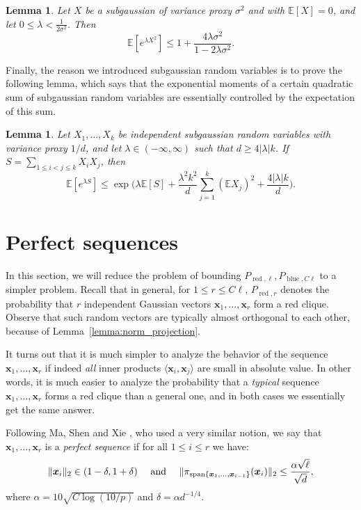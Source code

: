 \documentclass[11pt]{amsart}
\newtheorem{lemma}[theorem]{\bf Lemma}
\theoremstyle{definition}
\def\bE{\mathbb{E}}
\def\bx{\boldsymbol{x}}
\DeclareMathOperator{\red}{red}
\DeclareMathOperator{\blue}{blue}
\begin{document}
\begin{lemma}\label{lemma:exponential_square_moments}
Let $X$ be a subgaussian of variance proxy $\sigma^2$ and with $\bE[X]=0$, and let $0\leq \lambda< \frac{1}{2\sigma^2}$. Then
{\smaller[0.3]
\[\bE[e^{\lambda X^2}]\leq 1+\frac{4\lambda \sigma^2}{1-2\lambda\sigma^2}.\]
}
\end{lemma}

Finally, the reason we introduced subgaussian random variables is to prove the following lemma, which says that the exponential moments of a certain quadratic sum of subgaussian random variables are essentially controlled by the expectation of this sum.

\begin{lemma}\label{lemma:exponential_moment_special_case}
Let $X_1, \dots, X_k$ be independent subgaussian random variables with variance proxy $1/d$, and let $\lambda\in (-\infty, \infty)$ such that $d\geq 4|\lambda| k$. If $S=\sum_{1\leq i<j\leq k}X_iX_j$, then
{\smaller[0.3]
\[\bE[e^{\lambda S}]\leq \exp\bigg( \lambda \bE[S] + \frac{\lambda^2k^2}{d}\sum_{j=1}^k (\bE X_j)^2 +\frac{4|\lambda| k}{d}\bigg).\]
}
\end{lemma}

\section{Perfect sequences}\label{sec:perfect}

In this section, we will reduce the problem of bounding $P_{\red, \ell}, P_{\blue, C\ell}$ to a simpler problem. Recall that in general, for $1\leq r\leq C\ell$, $P_{\red, r}$ denotes the probability that $r$ independent Gaussian vectors $\bx_1, \dots, \bx_r$ form a red clique. Observe that such random vectors are typically almost orthogonal to each other, because of Lemma~\ref{lemma:norm_projection}.

It turns out that it is much simpler to analyze the behavior of the sequence $\bx_1, \dots, \bx_r$ if indeed \textit{all} inner products $\langle \bx_i, \bx_j\rangle$ are small in absolute value. In other words, it is much easier to analyze the probability that a \textit{typical} sequence $\bx_1, \dots, \bx_r$ forms a red clique than a general one, and in both cases we essentially get the same answer.

Following Ma, Shen and Xie \cite{MSX25}, who used a very similar notion, we say that $\bx_1, \dots, \bx_r$ is a \textit{perfect sequence} if for all $1\leq i\leq r$ we have:
{\smaller[0.3]
\[\|\bx_i\|_2\in (1-\delta, 1+\delta) \quad\text{ and }\quad \|\pi_{{\rm span} \{\bx_1, \dots, \bx_{i-1}\}} (\bx_i)\|_2\leq \frac{\alpha\sqrt{\ell}}{\sqrt{d}},\]
}
where $\alpha=10\sqrt{C\log(10/p)}$ and $\delta=\alpha d^{-1/4}$.
\end{document}
